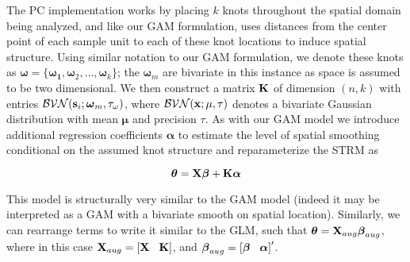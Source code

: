 \documentclass[12pt,fleqn]{article}
\begin{document}
\begin{flushleft}
The PC implementation works by placing $k$ knots throughout the spatial domain being analyzed, and like our GAM formulation, uses distances from the center point of each sample unit to each of these knot locations to induce spatial structure.  Using similar notation to our GAM formulation, we denote these knots as $\boldsymbol{\omega} = \{ \boldsymbol{\omega_{1}},\boldsymbol{\omega}_{2},\hdots,\boldsymbol{\omega}_{k} \}$; the $\boldsymbol{\omega}_m$ are bivariate in this  instance as space is assumed to be two dimensional.  We then construct a matrix ${\bf K}$ of dimension $(n,k)$ with entries $\mathcal{BVN}({\bf s}_i;\boldsymbol{\omega}_m,\tau_{\omega})$, where $\mathcal{BVN}({\bf x};{\bf \mu},\tau)$ denotes a bivariate Gaussian distribution with mean $\boldsymbol{\mu}$ and precision $\tau$.  As with our GAM model we introduce additional regression coefficients $\boldsymbol{\alpha}$ to estimate the level of spatial smoothing conditional on the assumed knot structure and reparameterize the STRM as
\begin{linenomath*}
\begin{equation}
  \label{eq:PC}
  \boldsymbol{\theta}={\bf X} \boldsymbol{\beta} + {\bf K} \boldsymbol{\alpha}
\end{equation}
\end{linenomath*}
This model is structurally very similar to the GAM model (indeed it may be interpreted as a GAM with a bivariate smooth on spatial location).  Similarly, we can rearrange terms to write it similar to the GLM, such that
$\boldsymbol{\theta}={\bf X}_{aug} \boldsymbol{\beta}_{aug}$,
where in this case ${\bf X}_{aug} = \left[ {\bf X} \hspace{3mm} {\bf K} \right]$, and $\boldsymbol{\beta}_{aug}=\left[  \boldsymbol{\beta} \hspace{3mm} \boldsymbol{\alpha} \right] ^\prime$.


\end{flushleft}
\end{document}
